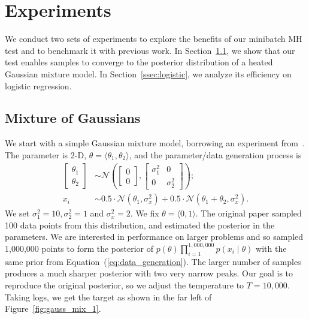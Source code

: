 \documentclass[twoside]{article} \usepackage{aistats2017}
\begin{document}
\section{Experiments}\label{sec:experiments}

We conduct two sets of experiments to explore the benefits of our minibatch MH
test and to benchmark it with previous work. In Section~\ref{ssec:gaussians}, we
show that our test enables samples to converge to the posterior distribution of
a heated Gaussian mixture model. In Section~\ref{ssec:logistic}, we analyze its
efficiency on logistic regression.

\subsection{Mixture of Gaussians}\label{ssec:gaussians}

We start with a simple Gaussian mixture model, borrowing an experiment
from~\citet{langevin_2011}.  The parameter is 2-D, $\theta =
\langle \theta_1,\theta_2 \rangle$, and the parameter/data generation process is
\begin{equation}\label{eq:data_generation}
\begin{split}
    \begin{bmatrix} \theta_1 \\ \theta_2 \end{bmatrix} 
    & \sim \mathcal{N}\left(\begin{bmatrix}0 \\ 0\end{bmatrix}, 
    \begin{bmatrix} \sigma_1^2 & 0 \\ 0 & \sigma_2^2\end{bmatrix} \right); \\
    x_i & \sim 0.5 \cdot \mathcal{N}(\theta_1, \sigma_x^2) + 0.5 \cdot \mathcal{N}(\theta_1+\theta_2, \sigma_x^2).
\end{split}
\end{equation}
We set $\sigma_1^2 = 10, \sigma_2^2 = 1$ and $\sigma_x^2=2$.  We fix $\theta =
\langle 0,1 \rangle$. The original paper sampled 100 data points from this
distribution, and estimated the posterior in the parameters. We are interested
in performance on larger problems and so sampled 1,000,000 points to form the
posterior of $p(\theta)\prod_{i=1}^{1,000,000}p(x_i\mid \theta)$ with the same
prior from Equation~(\ref{eq:data_generation}). The larger number of samples
produces a much sharper posterior with two very narrow peaks.  Our goal is to
reproduce the original posterior, so we adjust the temperature to $T=10,000$.
Taking logs, we get the target as shown in the far left of
Figure~\ref{fig:gauss_mix_1}.
\end{document}

